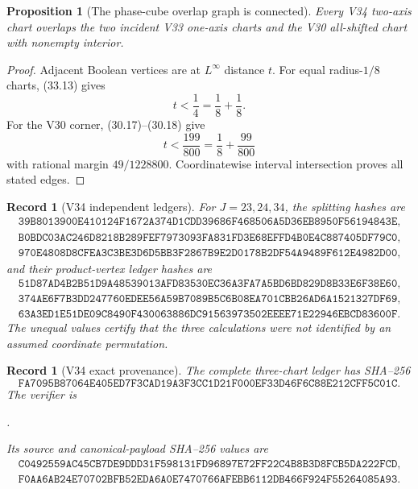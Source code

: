 \documentclass[11pt,oneside]{article}
\newtheorem{proposition}[theorem]{Proposition}
\newtheorem{record}[theorem]{Record}
\theoremstyle{definition}
\theoremstyle{remark}
\begin{document}
\begin{proposition}[The phase-cube overlap graph is connected]
\label{prop:newv34-graph}
Every V34 two-axis chart overlaps the two incident V33 one-axis
charts and the V30 all-shifted chart with nonempty interior.
\end{proposition}

\begin{proof}
Adjacent Boolean vertices are at \(L^\infty\) distance \(t\).
For equal radius-\(1/8\) charts, (33.13) gives
\[
 t<\frac14=\frac18+\frac18.
\]
For the V30 corner, (30.17)--(30.18) give
\[
 t<\frac{199}{800}=\frac18+\frac{99}{800}
\]
with rational margin \(49/1228800\).  Coordinatewise interval
intersection proves all stated edges.
\end{proof}

\begin{record}[V34 independent ledgers]
\label{rec:newv34-ledgers}
For \(J=23,24,34\), the splitting hashes are
\[
\begin{gathered}
\texttt{39B8013900E410124F1672A374D1CDD39686F468506A5D36EB8950F56194843E},\\
\texttt{B0BDC03AC246D8218B289FEF7973093FA831FD3E68EFFD4B0E4C887405DF79C0},\\
\texttt{970E4808D8CFEA3C3BE3D6D5BB3F2867B9E2D0178B2DF54A9489F612E4982D00},
\end{gathered}                                          \tag{34.15}
\]
and their product-vertex ledger hashes are
\[
\begin{gathered}
\texttt{51D87AD4B2B51D9A48539013AFD83530EC36A3FA7A5BD6BD829D8B33E6F38E60},\\
\texttt{374AE6F7B3DD247760EDEE56A59B7089B5C6B08EA701CBB26AD6A1521327DF69},\\
\texttt{63A3ED1E51DE09C8490F430063886DC91563973502EEEE71E22946EBCD83600F}.
\end{gathered}                                          \tag{34.16}
\]
The unequal values certify that the three calculations were not
identified by an assumed coordinate permutation.
\end{record}

\begin{record}[V34 exact provenance]
\label{rec:newv34-provenance}
The complete three-chart ledger has SHA--256
\[
\texttt{FA7095B87064E405ED7F3CAD19A3F3CC1D21F000EF33D46F6C88E212CFF5C01C}.
                                                               \tag{34.17}
\]
The verifier is
\begin{center}
\footnotesize
{}.
\end{center}
Its source and canonical-payload SHA--256 values are
\[
\begin{gathered}
\texttt{C0492559AC45CB7DE9DDD31F598131FD96897E72FF22C4B8B3D8FCB5DA222FCD},\\
\texttt{F0AA6AB24E70702BFB52EDA6A0E7470766AFEBB6112DB466F924F55264085A93}.
\end{gathered}                                          \tag{34.18}
\]
\end{record}
\end{document}
